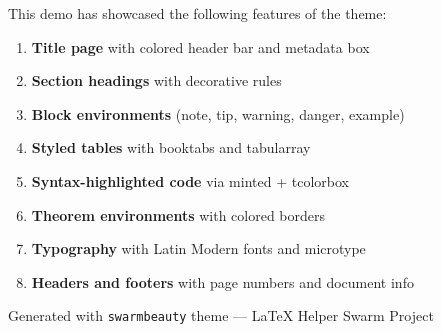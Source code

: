 \documentclass[11pt, a4paper]{scrartcl}
\begin{document}
This demo has showcased the following features of the  theme:

\begin{enumerate}
  \item \textbf{Title page} with colored header bar and metadata box
  \item \textbf{Section headings} with decorative rules
  \item \textbf{Block environments} (note, tip, warning, danger, example)
  \item \textbf{Styled tables} with booktabs and tabularray
  \item \textbf{Syntax-highlighted code} via minted + tcolorbox
  \item \textbf{Theorem environments} with colored borders
  \item \textbf{Typography} with Latin Modern fonts and microtype
  \item \textbf{Headers and footers} with page numbers and document info
\end{enumerate}


\begin{center}
  \small\textcolor{sbMedium}{%
    Generated with \texttt{swarmbeauty} theme --- LaTeX Helper Swarm Project%
  }
\end{center}
\end{document}
